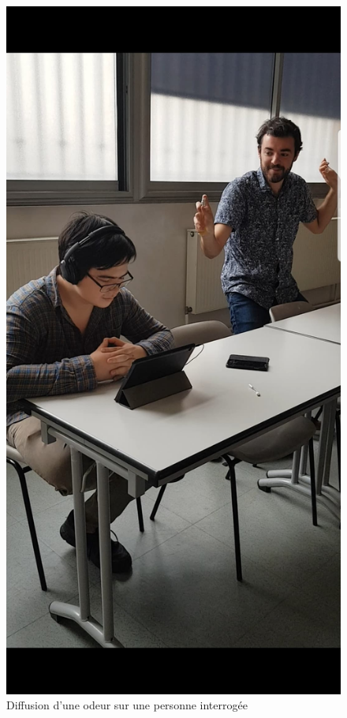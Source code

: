 \documentclass[a4paper,14pt]{report}
\begin{document}
\begin{figure}[!h]
\begin{center}
\end{center}

\end{figure}


\begin{figure}[!h]
\begin{center}

\includegraphics[scale=0.15]{../Images/odeurs.jpg}
\caption{Diffusion d'une odeur sur une personne interrogée }

\end{center}

\end{figure}
\end{document}
